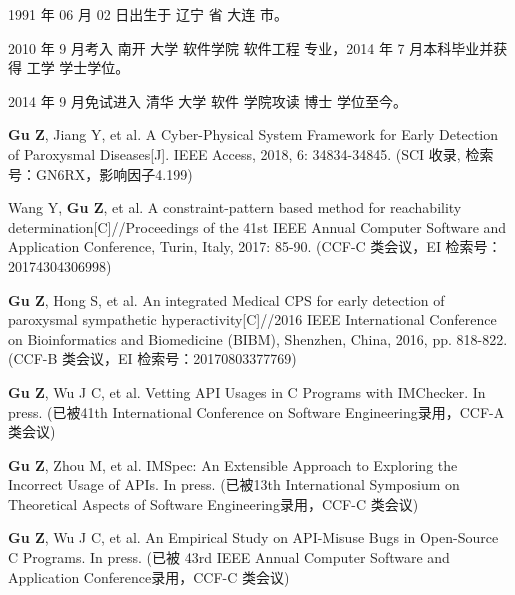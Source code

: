 \begin{resume}


  1991 年 06 月 02 日出生于 辽宁 省 大连 市。

  2010 年 9 月考入 南开 大学 软件学院  软件工程 专业，2014 年 7 月本科毕业并获得 工学 学士学位。

  2014 年 9 月免试进入 清华 大学 软件 学院攻读 博士 学位至今。


  \begin{publications}
    \item \textbf{Gu Z}, Jiang Y, et al. A Cyber-Physical System Framework for Early Detection of Paroxysmal Diseases[J]. IEEE Access, 2018, 6: 34834-34845. (SCI 收录, 检索号：GN6RX，影响因子4.199)
    \item Wang Y, \textbf{Gu Z}, et al. A constraint-pattern based method for reachability determination[C]//Proceedings of the 41st IEEE Annual Computer Software and Application Conference, Turin, Italy, 2017: 85-90. (CCF-C 类会议，EI 检索号：20174304306998)
    \item \textbf{Gu Z}, Hong S, et al. An integrated Medical CPS for early detection of paroxysmal sympathetic hyperactivity[C]//2016 IEEE International Conference on Bioinformatics and Biomedicine (BIBM), Shenzhen, China, 2016, pp. 818-822. (CCF-B 类会议，EI 检索号：20170803377769)
  \end{publications}

  \begin{publications}[before=\publicationskip,after=\publicationskip]
    \item \textbf{Gu Z}, Wu J C, et al. Vetting API Usages in C Programs with IMChecker. In press. (已被41th International Conference on Software Engineering录用，CCF-A 类会议)
    \item \textbf{Gu Z}, Zhou M, et al. IMSpec: An Extensible Approach to Exploring the Incorrect Usage of APIs. In press. (已被13th International Symposium on Theoretical Aspects of Software Engineering录用，CCF-C 类会议)
    \item \textbf{Gu Z}, Wu J C, et al. An Empirical Study on API-Misuse Bugs in Open-Source C Programs. In press. (已被 43rd IEEE Annual Computer Software and Application Conference录用，CCF-C 类会议)
  \end{publications}



\end{resume}
